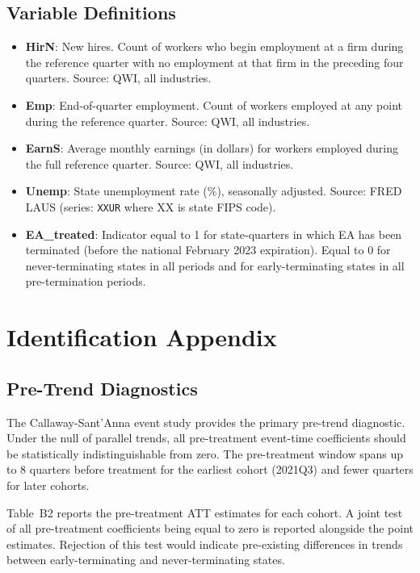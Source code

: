 \documentclass[12pt]{article}
\begin{document}
\subsection{Variable Definitions}

\begin{itemize}
    \item \textbf{HirN}: New hires. Count of workers who begin employment at a firm during the reference quarter with no employment at that firm in the preceding four quarters. Source: QWI, all industries.
    \item \textbf{Emp}: End-of-quarter employment. Count of workers employed at any point during the reference quarter. Source: QWI, all industries.
    \item \textbf{EarnS}: Average monthly earnings (in dollars) for workers employed during the full reference quarter. Source: QWI, all industries.
    \item \textbf{Unemp}: State unemployment rate (\%), seasonally adjusted. Source: FRED LAUS (series: \texttt{XXUR} where XX is state FIPS code).
    \item \textbf{EA\_treated}: Indicator equal to 1 for state-quarters in which EA has been terminated (before the national February 2023 expiration). Equal to 0 for never-terminating states in all periods and for early-terminating states in all pre-termination periods.
\end{itemize}

\section{Identification Appendix}
\label{sec:identification}

\subsection{Pre-Trend Diagnostics}

The Callaway-Sant'Anna event study provides the primary pre-trend diagnostic. Under the null of parallel trends, all pre-treatment event-time coefficients should be statistically indistinguishable from zero. The pre-treatment window spans up to 8 quarters before treatment for the earliest cohort (2021Q3) and fewer quarters for later cohorts.


Table~B2 reports the pre-treatment ATT estimates for each cohort. A joint test of all pre-treatment coefficients being equal to zero is reported alongside the point estimates. Rejection of this test would indicate pre-existing differences in trends between early-terminating and never-terminating states.
\end{document}
